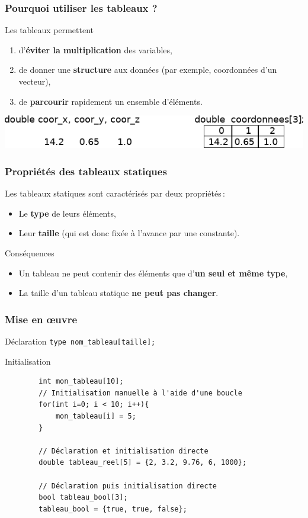 \begin{frame}
	\frametitle{Pourquoi utiliser les tableaux ?}
	\begin{block}{Les tableaux permettent}
		\begin{enumerate}
		\item d'\textbf{éviter la multiplication} des variables,
		\item de donner une \textbf{structure} aux données (par exemple, coordonnées d'un vecteur),
		\item de \textbf{parcourir} rapidement un ensemble d'éléments.
		\end{enumerate}
	\end{block}
    
    \includegraphics[width=\textwidth]{images/tableau}
\end{frame}

\begin{frame}[fragile]
	\frametitle{Propriétés des tableaux statiques}
	Les tableaux statiques sont caractérisés par deux propriétés\,:
	\begin{itemize}
		\item Le \textbf{type} de leurs éléments,
		\item Leur \textbf{taille} (qui est donc fixée à l'avance par une constante).
	\end{itemize}
    
    \begin{alertblock}{Conséquences}
    \begin{itemize}
    	\item Un tableau ne peut contenir des éléments que d'\textbf{un seul et même type},
        \item La taille d'un tableau statique \textbf{ne peut pas changer}.
    \end{itemize}
    \end{alertblock}
\end{frame}

\begin{frame}[fragile=singleslide]
	\frametitle{{Mise en \oe{}uvre}}
	\begin{exampleblock}{Déclaration}
		\centering
		\texttt{type nom_tableau[taille];}
	\end{exampleblock}
	
	\begin{exampleblock}{Initialisation}
    \begin{verbatim}
		int mon_tableau[10];
		// Initialisation manuelle à l'aide d'une boucle
		for(int i=0; i < 10; i++){
        	mon_tableau[i] = 5;
		}

		// Déclaration et initialisation directe
		double tableau_reel[5] = {2, 3.2, 9.76, 6, 1000};

		// Déclaration puis initialisation directe
		bool tableau_bool[3];
		tableau_bool = {true, true, false};
    \end{verbatim}
	\end{exampleblock}
\end{frame}

